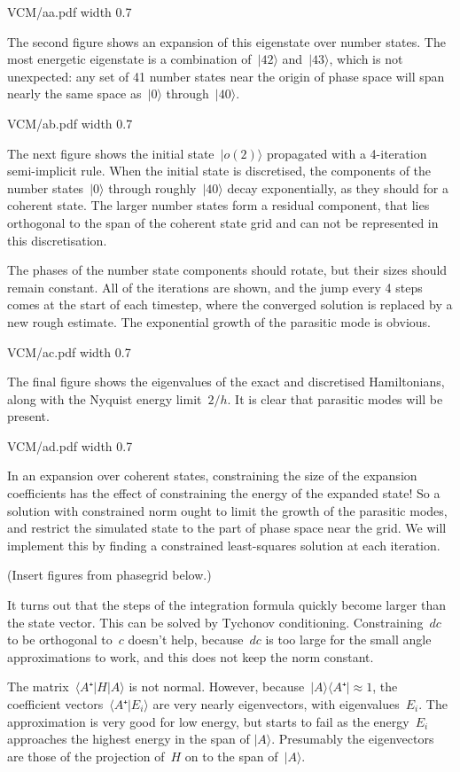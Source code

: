 \XeTeXpdffile VCM/aa.pdf width 0.7\hsize

The second figure shows an expansion of this eigenstate over number states.  The most energetic eigenstate is a combination of~$|42〉$ and~$|43〉$, which is not unexpected: any set of 41 number states near the origin of phase space will span nearly the same space as~$|0〉$ through~$|40〉$.

\XeTeXpdffile VCM/ab.pdf width 0.7\hsize

The next figure shows the initial state~$|o(2)〉$ propagated with a 4-iteration semi-implicit rule.  When the initial state is discretised, the components of the number states~$|0〉$ through roughly~$|40〉$ decay exponentially, as they should for a coherent state.  The larger number states form a residual component, that lies orthogonal to the span of the coherent state grid and can not be represented in this discretisation.

The phases of the number state components should rotate, but their sizes should remain constant.  All of the iterations are shown, and the jump every 4 steps comes at the start of each timestep, where the converged solution is replaced by a new rough estimate.  The exponential growth of the parasitic mode is obvious.

\XeTeXpdffile VCM/ac.pdf width 0.7\hsize

The final figure shows the eigenvalues of the exact and discretised Hamiltonians, along with the Nyquist energy limit~$2/h$.  It is clear that parasitic modes will be present.

\XeTeXpdffile VCM/ad.pdf width 0.7\hsize

In an expansion over coherent states, constraining the size of the expansion coefficients has the effect of constraining the energy of the expanded state!  So a solution with constrained norm ought to limit the growth of the parasitic modes, and restrict the simulated state to the part of phase space near the grid.  We will implement this by finding a constrained least-squares solution at each iteration. 

(Insert figures from phasegrid below.)

It turns out that the steps of the integration formula quickly become larger than the state vector.  This can be solved by Tychonov conditioning.  Constraining~$dc$ to be orthogonal to~$c$ doesn't help, because~$dc$ is too large for the small angle approximations to work, and this does not keep the norm constant.

The matrix~$〈A⁺|H|A〉$ is not normal.  However, because~$|A〉〈A⁺|≈1$, the coefficient vectors~$〈A⁺|E_i〉$ are very nearly eigenvectors, with eigenvalues~$E_i$.  The approximation is very good for low energy, but starts to fail as the energy~$E_i$ approaches the highest energy in the span of $|A〉$.  Presumably the eigenvectors are those of the projection of~$H$ on to the span of~$|A〉$.


